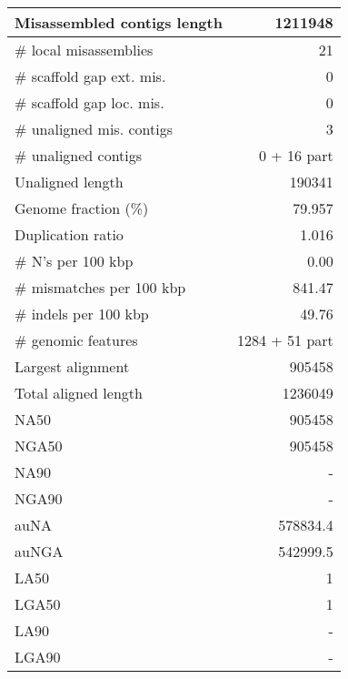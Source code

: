 \documentclass[12pt,a4paper]{article}
\begin{document}
\begin{table}[ht]
\begin{center}
\begin{tabular}{|l*{1}{|r}|}
Misassembled contigs length & 1211948 \\ \hline
\# local misassemblies & 21 \\ \hline
\# scaffold gap ext. mis. & 0 \\ \hline
\# scaffold gap loc. mis. & 0 \\ \hline
\# unaligned mis. contigs & 3 \\ \hline
\# unaligned contigs & 0 + 16 part \\ \hline
Unaligned length & 190341 \\ \hline
Genome fraction (\%) & 79.957 \\ \hline
Duplication ratio & 1.016 \\ \hline
\# N's per 100 kbp & 0.00 \\ \hline
\# mismatches per 100 kbp & 841.47 \\ \hline
\# indels per 100 kbp & 49.76 \\ \hline
\# genomic features & 1284 + 51 part \\ \hline
Largest alignment & 905458 \\ \hline
Total aligned length & 1236049 \\ \hline
NA50 & 905458 \\ \hline
NGA50 & 905458 \\ \hline
NA90 & - \\ \hline
NGA90 & - \\ \hline
auNA & 578834.4 \\ \hline
auNGA & 542999.5 \\ \hline
LA50 & 1 \\ \hline
LGA50 & 1 \\ \hline
LA90 & - \\ \hline
LGA90 & - \\ \hline
\end{tabular}
\end{center}
\end{table}
\end{document}
